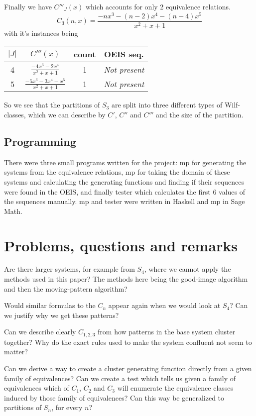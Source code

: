 \documentclass[openany, a4paper, 11pt, english]{article}
\theoremstyle{definition}
\newcommand{\Sym}{S}
\begin{document}
Finally we have $C'''_J(x)$ which accounts for only 2 equivalence relations.
\[
    C_3(n,x) = \frac{-nx^3-(n-2)x^4-(n-4)x^5}{x^2+x+1}
\]
with it's instances being
\begin{center}
\begin{tabular}{c|c|c|c}
    $|J|$ & $C'''(x)$ & count & OEIS seq. \\
    \hline
    4 & $\frac{-4x^3-2x^4}{x^2+x+1}$ & 1 & \emph{Not present} \\ 
    5 & $\frac{-5x^3-3x^4-x^5}{x^2+x+1}$ & 1 & \emph{Not present}\\
\end{tabular}
\end{center}

So we see that the partitions of $\Sym_3$ are split into three different types
of Wilf-classes, which we can describe by $C'$, $C''$ and $C'''$ and the size
of the partition.

\subsection{Programming}
There were three small programs written for the project: mp for generating the
systems from the equivalence relations, mp for taking the domain of these
systems and calculating the generating functions and finding if their sequences
were found in the OEIS, and finally tester which calculates the first 6 values
of the sequences manually. mp and tester were written in Haskell and mp in Sage Math. 


\section{Problems, questions and remarks}
Are there larger systems, for example from $\Sym_4$, where we cannot apply the
methods used in this paper? The methods here being the good-image algorithm and
then the moving-pattern algorithm?

Would similar formulas to the $C_n$ appear again when we would
look at $\Sym_4$? Can we justify why we get these patterns?

Can we describe clearly $C_{1,2,3}$ from how patterns in the base system cluster together?
Why do the exact rules used to make the system confluent not seem to matter?

Can we derive a way to create a cluster generating function directly from a
given family of equivalences? Can we create a test which tells us given a family
of equivalences which of $C_1$, $C_2$ and $C_3$ will enumerate the equivalence
classes induced by those family of equivalences?
Can this way be generalized to partitions of $\Sym_n$, for every $n$?
\end{document}
